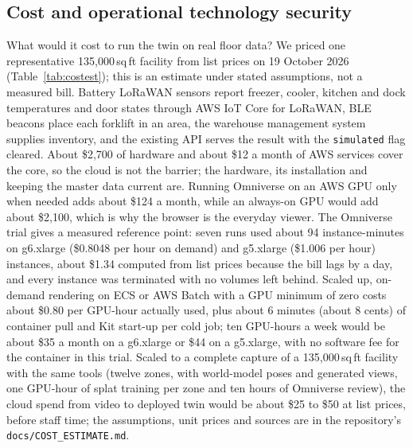 \documentclass{article}
\newcommand{\code}[1]{\texttt{\small #1}}
\begin{document}
\subsection{Cost and operational technology security}
What would it cost to run the twin on real floor data? We priced one
representative 135{,}000\,sq\,ft facility from list prices on 19 October 2026
(Table~\ref{tab:costest}); this is an estimate under stated assumptions, not
a measured bill. Battery LoRaWAN sensors report freezer, cooler, kitchen and
dock temperatures and door states through AWS IoT Core for LoRaWAN, BLE
beacons place each forklift in an area, the warehouse management system
supplies inventory, and the existing API serves the result with the
\code{simulated} flag cleared. About \$2{,}700 of hardware and about \$12 a
month of AWS services cover the core, so the cloud is not the barrier; the
hardware, its installation and keeping the master data current are. Running
Omniverse on an AWS GPU only when needed adds about \$124 a month, while an
always-on GPU would add about \$2{,}100, which is why the browser is the
everyday viewer. The Omniverse trial gives a measured reference point: seven
runs used about 94 instance-minutes on g6.xlarge (\$0.8048 per hour on demand)
and g5.xlarge (\$1.006 per hour) instances, about \$1.34 computed from list
prices because the bill lags by a day, and every instance was terminated with
no volumes left behind. Scaled up, on-demand rendering on ECS or AWS Batch
with a GPU minimum of zero costs about \$0.80 per GPU-hour actually used,
plus about 6 minutes (about 8 cents) of container pull and Kit start-up per
cold job; ten GPU-hours a week would be about \$35 a month on a g6.xlarge or
\$44 on a g5.xlarge, with no software fee for the container in this trial. Scaled to a complete capture of a 135{,}000\,sq\,ft facility with the same
tools (twelve zones, with world-model poses and generated views, one GPU-hour of
splat training per zone and ten hours of Omniverse review), the cloud spend from
video to deployed twin would be about \$25 to \$50 at list prices, before staff
time; the assumptions, unit prices and sources are in the repository's
\code{docs/COST\_ESTIMATE.md}.
\end{document}
